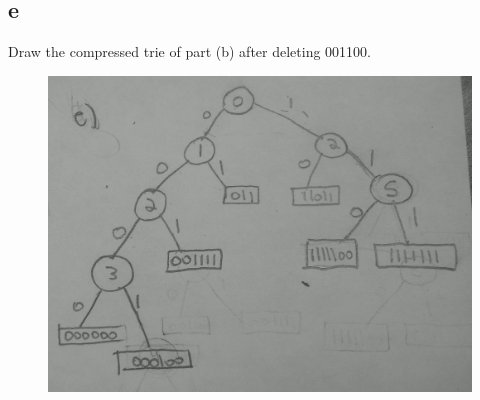 \documentclass[12pt]{article}
\begin{document}
\begin{itemize}
\part{e} Draw the compressed trie of part (b) after deleting 001100.
\begin{figure}[ht!]
\centering
\includegraphics[width=170mm]{6e.jpg}
\label{overflow}
\end{figure}
\end{itemize}

\end{document}
